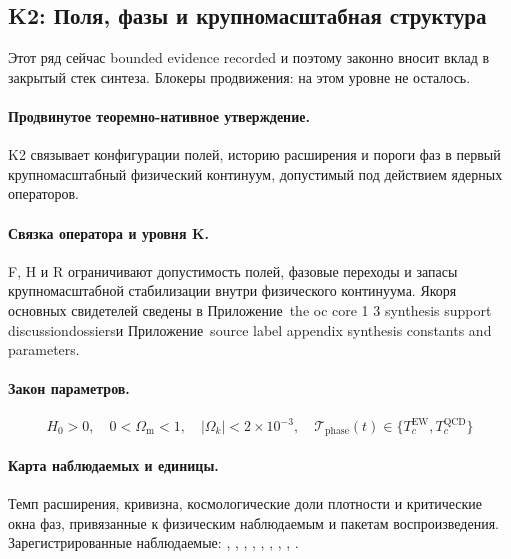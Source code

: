 \subsection{K2: Поля, фазы и крупномасштабная структура}
\label{sec:oc-core-1-3-synthesis-k2}
Этот ряд сейчас bounded evidence recorded и поэтому законно вносит вклад в закрытый стек синтеза.
Блокеры продвижения: на этом уровне не осталось.

\paragraph{Продвинутое теоремно-нативное утверждение.}
K2 связывает конфигурации полей, историю расширения и пороги фаз в первый крупномасштабный физический континуум, допустимый под действием ядерных операторов.

\paragraph{Связка оператора и уровня K.}
F, H и R ограничивают допустимость полей, фазовые переходы и запасы крупномасштабной стабилизации внутри физического континуума.
Якоря основных свидетелей сведены в Приложение~the oc core 1 3 synthesis support discussiondossiersи Приложение~source label appendix synthesis constants and parameters.

\paragraph{Закон параметров.}
\[
H_0 > 0,\quad 0 < \Omega_{\mathrm{m}} < 1,\quad |\Omega_k| < 2 \times 10^{-3},\quad \mathcal{T}_{\mathrm{phase}}(t) \in \{T_c^{\mathrm{EW}}, T_c^{\mathrm{QCD}}\}
\]

\paragraph{Карта наблюдаемых и единицы.}
Темп расширения, кривизна, космологические доли плотности и критические окна фаз, привязанные к физическим наблюдаемым и пакетам воспроизведения.
Зарегистрированные наблюдаемые: , \allowbreak {}, \allowbreak {}, \allowbreak {}, \allowbreak {}, \allowbreak {}, \allowbreak {}, \allowbreak {}, \allowbreak {}.

